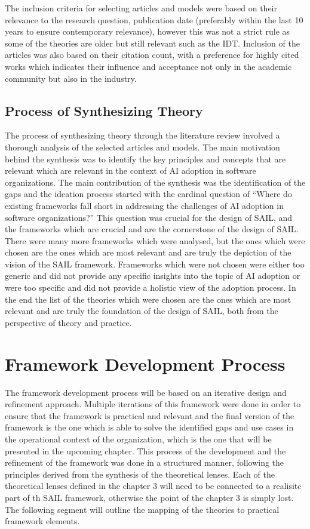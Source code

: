 \documentclass[]{imc-inf}
\begin{document}
The inclusion criteria for selecting articles and models were based on
their relevance to the research question, publication date (preferably
within the last 10 years to ensure contemporary relevance), however this
was not a strict rule as some of the theories are older but still
relevant such as the IDT. Inclusion of the articles was also based on
their citation count, with a preference for highly cited works which
indicates their influence and acceptance not only in the academic
community but also in the industry.

\subsection{Process of Synthesizing
	Theory}\label{process-of-synthesizing-theory}

The process of synthesizing theory through the literature review
involved a thorough analysis of the selected articles and models. The
main motivation behind the synthesis was to identify the key principles
and concepts that are relevant which are relevant in the context of AI
adoption in software organizations. The main contribution of the
synthesis was the identification of the gaps and the ideation process
started with the cardinal question of ``Where do existing frameworks
fall short in addressing the challenges of AI adoption in software
organizations?'' This question was crucial for the design of SAIL, and
the frameworks which are crucial and are the cornerstone of the design
of SAIL. There were many more frameworks which were analysed, but the
ones which were chosen are the ones which are most relevant and are
truly the depiction of the vision of the SAIL framework. Frameworks
which were not chosen were either too generic and did not provide any
specific insights into the topic of AI adoption or were too specific and
did not provide a holistic view of the adoption process. In the end the
list of the theories which were chosen are the ones which are most
relevant and are truly the foundation of the design of SAIL, both from
the perspective of theory and practice.

\section{Framework Development
	Process}\label{framework-development-process}


The framework development process will be based on an iterative design
and refinement approach. Multiple iterations of this framework were done
in order to ensure that the framework is practical and relevant and the
final version of the framework is the one which is able to solve the
identified gaps and use cases in the operational context of the
organization, which is the one that will be presented in the upcoming
chapter. This process of the development and the refinement of the
framework was done in a structured manner, following the principles
derived from the synthesis of the theoretical lenses. Each of the
theoretical lenses defined in the chapter 3 will need to be connected to
a realisitc part of th SAIL framework, otherwise the point of the
chapter 3 is simply lost. The following segment will outline the mapping
of the theories to practical framework elements.
\end{document}
